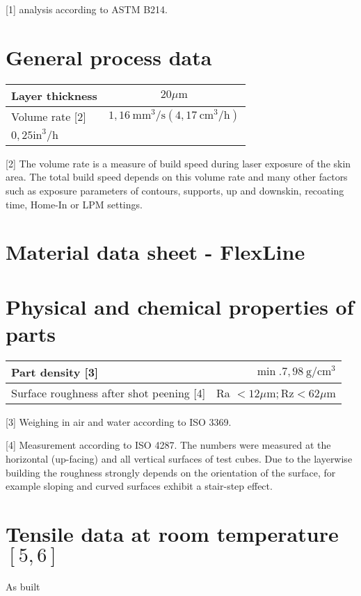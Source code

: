 \documentclass[10pt]{article}
\begin{document}
[1] analysis according to ASTM B214.

\section*{General process data}
\begin{center}
\begin{tabular}{lc}
\hline
Layer thickness & $20 \mu \mathrm{m}$ \\
\hline
Volume rate [2] & $1,16 \mathrm{~mm}^{3} / \mathrm{s}\left(4,17 \mathrm{~cm}^{3} / \mathrm{h}\right)$ \\
$0,25 \mathrm{in}^{3} / \mathrm{h}$ &  \\
\end{tabular}
\end{center}

[2] The volume rate is a measure of build speed during laser exposure of the skin area. The total build speed depends on this volume rate and many other factors such as exposure parameters of contours, supports, up and downskin, recoating time, Home-In or LPM settings.

\section*{Material data sheet - FlexLine}
\section*{Physical and chemical properties of parts}
\begin{center}
\begin{tabular}{lr}
\hline
Part density [3] & $\min .7,98 \mathrm{~g} / \mathrm{cm}^{3}$ \\
\hline
Surface roughness after shot peening [4] & Ra $<12 \mu \mathrm{m} ; \mathrm{Rz}<62 \mu \mathrm{m}$ \\
\hline
\end{tabular}
\end{center}

[3] Weighing in air and water according to ISO 3369.

[4] Measurement according to ISO 4287. The numbers were measured at the horizontal (up-facing) and all vertical surfaces of test cubes. Due to the layerwise building the roughness strongly depends on the orientation of the surface, for example sloping and curved surfaces exhibit a stair-step effect.

\section*{Tensile data at room temperature $[5,6]$}
As built
\end{document}
